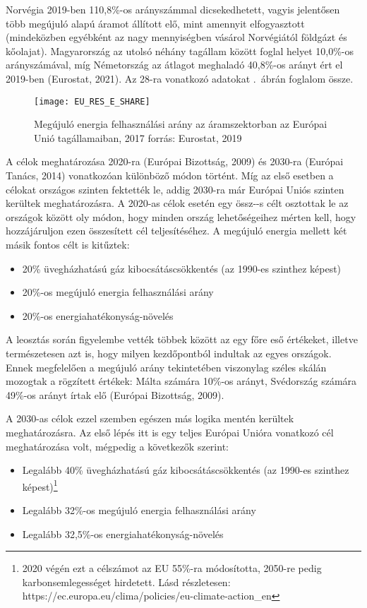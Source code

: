 \documentclass[twoside, magyar, showtrims]{corvinusphd}
\begin{document}
Norvégia 2019-ben 110,8\%-os arányszámmal
dicsekedhetett, vagyis jelentősen több megújuló alapú áramot állított
elő, mint amennyit elfogyasztott (mindeközben egyébként
az  nagy mennyiségben vásárol Norvégiától
földgázt és kőolajat). Magyarország az utolsó
néhány tagállam között foglal helyet
10,0\%-os arányszámával, míg Németország az átlagot
meghaladó 40,8\%-os arányt ért el 2019-ben (Eurostat, 2021).
Az 28-ra vonatkozó adatokat .~ábrán
foglalom össze.

\begin{figure}
    \centering
    \texttt{[image: EU\_RES\_E\_SHARE]}
    \caption{Megújuló energia felhasználási arány az áramszektorban az Európai Unió tagállamaiban, 2017 forrás: Eurostat, 2019}
    \label{fig:EU_RES_E}
\end{figure}

A célok meghatározása 2020-ra (Európai Bizottság, 2009)
és 2030-ra (Európai Tanács, 2014) vonatkozóan különböző módon történt. 
Míg az első esetben a célokat országos szinten fektették le,
addig 2030-ra már Európai Uniós szinten kerültek meghatározásra. 
A 2020-as célok esetén egy össz--s célt osztottak le az országok
között oly módon, hogy minden ország lehetőségeihez mérten 
kell, hogy hozzájáruljon ezen összesített cél teljesítéséhez.
A megújuló energia mellett két másik fontos célt is kitűztek:

\begin{itemize}
    \item
    20\% üvegházhatású gáz kibocsátáscsökkentés (az 1990-es szinthez képest)
    \item
    20\%-os megújuló energia felhasználási arány
    \item
    20\%-os energiahatékonyság-növelés
\end{itemize}

A leosztás során figyelembe vették többek között
az egy főre eső  értékeket, illetve természetesen azt is, 
hogy milyen kezdőpontból indultak az egyes országok.
Ennek megfelelően a megújuló arány tekintetében viszonylag
széles skálán mozogtak a rögzített értékek: Málta számára 10\%-os
arányt, Svédország számára 49\%-os arányt írtak elő (Európai Bizottság, 2009).

A 2030-as célok ezzel szemben egészen más
logika mentén kerültek meghatározásra.
Az első lépés itt is egy teljes Európai Unióra vonatkozó
cél meghatározása volt, mégpedig a következők szerint:

\begin{itemize}
    \item
    Legalább 40\% üvegházhatású gáz kibocsátáscsökkentés (az 1990-es szinthez képest)\footnote{2020 végén ezt a célszámot az EU 55\%-ra módosította, 2050-re pedig karbonsemlegességet hirdetett. Lásd részletesen: https://ec.europa.eu/clima/policies/eu-climate-action\_en}
    \item
    Legalább 32\%-os megújuló energia felhasználási arány
    \item
    Legalább 32,5\%-os energiahatékonyság-növelés
\end{itemize}
\end{document}
